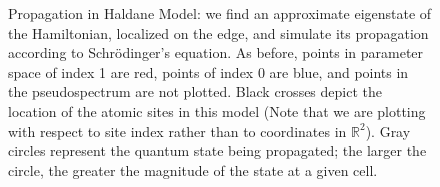 \documentclass[a4paper]{article}
\begin{document}
\begin{figure}
%
%

%
%
\caption{Propagation in Haldane Model: we find an approximate eigenstate of the Hamiltonian, localized on the edge, and simulate its propagation according to Schr{\"o}dinger's equation.
As before, points in parameter space of index 1 are red, points of index 0 are blue, and points in the pseudospectrum are not plotted.
Black crosses depict the location of the atomic sites in this model (Note that we are plotting with respect to site index rather than to coordinates in $\mathbb{R}^2$).
Gray circles represent the quantum state being propagated; the larger the circle, the greater the magnitude of the state at a given cell.
}%
\label{fig:haldane_prop}%
\end{figure}
\end{document}

